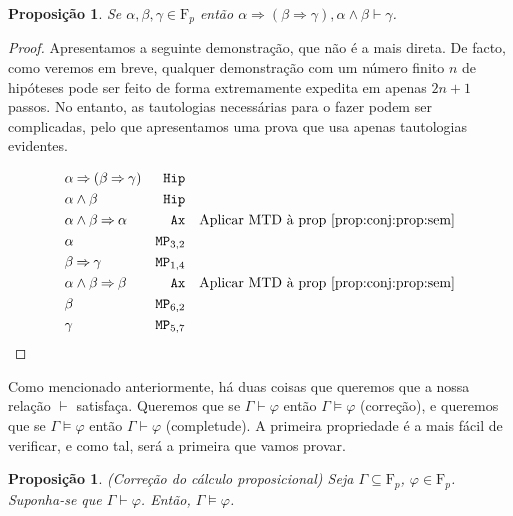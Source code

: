 \documentclass{report}
\newtheorem{prop}{Proposição}
\newtheorem*{prop*}{Proposição}
\theoremstyle{definition}
\theoremstyle{remark}
\newcommand{\F}{\mathrm{F}}
\newcommand{\imply}{\mathbin{\Rightarrow}}
\begin{document}
	\begin{prop*}
	Se $\alpha, \beta, \gamma \in \F_p$ então $\alpha \imply (\beta \imply \gamma), \alpha \land \beta \vdash \gamma$.
	\end{prop*}
	\begin{proof}
	Apresentamos a seguinte demonstração, que não é a mais direta. De facto, como veremos em breve, qualquer demonstração com um número finito $n$ de hipóteses pode ser feito de forma extremamente expedita em apenas $2n+1$ passos. No entanto, as tautologias necessárias para o fazer podem ser complicadas, pelo que apresentamos uma prova que usa apenas tautologias evidentes.
	
	\begin{align*}
	&\alpha \imply (\beta \imply \gamma) &\texttt{Hip}\\
	&\alpha \land \beta &\texttt{Hip}\\
	&\alpha \land \beta \imply \alpha &\texttt{Ax}&&\text{Aplicar MTD à prop \ref{prop:conj:prop:sem}}\\
	&\alpha &\texttt{MP}_{3,2}\\
	&\beta \imply \gamma &\texttt{MP}_{1, 4}\\
	&\alpha \land \beta \imply \beta &\texttt{Ax}&&\text{Aplicar MTD à prop \ref{prop:conj:prop:sem}}\\
	&\beta &\texttt{MP}_{6,2}\\
	&\gamma &\texttt{MP}_{5,7}
	\end{align*}
	\end{proof}
	
	\bigskip
	
	Como mencionado anteriormente, há duas coisas que queremos que a nossa relação $\vdash$ satisfaça. Queremos que se $\Gamma \vdash \varphi$ então $\Gamma \vDash \varphi$ (correção), e queremos que se $\Gamma \vDash \varphi$ então $\Gamma \vdash \varphi$ (completude). A primeira propriedade é a mais fácil de verificar, e como tal, será a primeira que vamos provar.
	
	\begin{prop}\label{prop:correcao} (Correção do cálculo proposicional)
	Seja $\Gamma \subseteq \F_p$, $\varphi \in \F_p$. Suponha-se que $\Gamma \vdash \varphi$. Então, $\Gamma \vDash \varphi$.
	\end{prop}
	
\end{document}

